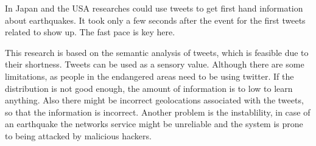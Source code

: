 In Japan and the USA researches could use tweets to get first hand information about earthquakes.
It took only a few seconds after the event for the first tweets related to show up.
The fast pace is key here.

This research is based on the semantic analysis of tweets,
which is feasible due to their shortness.
Tweets can be used as a sensory value.
Although there are some limitations,
as people in the endangered areas need to be using twitter.
If the distribution is not good enough,
the amount of information is to low to learn anything.
Also there might be incorrect geolocations associated with the tweets,
so that the information is incorrect.
Another problem is the instablility,
in case of an earthquake the networks service might be unreliable
and the system is prone to being attacked by malicious hackers.

